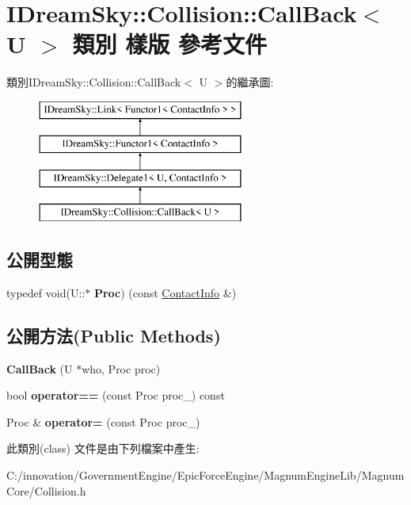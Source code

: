 \hypertarget{class_i_dream_sky_1_1_collision_1_1_call_back}{}\section{I\+Dream\+Sky\+:\+:Collision\+:\+:Call\+Back$<$ U $>$ 類別 樣版 參考文件}
\label{class_i_dream_sky_1_1_collision_1_1_call_back}
類別\+I\+Dream\+Sky\+:\+:Collision\+:\+:Call\+Back$<$ U $>$的繼承圖\+:\begin{figure}[H]
\begin{center}
\leavevmode
\includegraphics[height=4.000000cm]{class_i_dream_sky_1_1_collision_1_1_call_back}
\end{center}
\end{figure}
\subsection*{公開型態}
\begin{DoxyCompactItemize}
\item 
typedef void(U\+::$\ast$ {\bfseries Proc}) (const \hyperlink{class_i_dream_sky_1_1_collision_1_1_contact_info}{Contact\+Info} \&)\hypertarget{class_i_dream_sky_1_1_collision_1_1_call_back_a244d26a7409ff7ba6cfa250bf1cec7b9}{}\label{class_i_dream_sky_1_1_collision_1_1_call_back_a244d26a7409ff7ba6cfa250bf1cec7b9}

\end{DoxyCompactItemize}
\subsection*{公開方法(Public Methods)}
\begin{DoxyCompactItemize}
\item 
{\bfseries Call\+Back} (U $\ast$who, Proc proc)\hypertarget{class_i_dream_sky_1_1_collision_1_1_call_back_ac4b6f06302b584af05109ec9f99571d2}{}\label{class_i_dream_sky_1_1_collision_1_1_call_back_ac4b6f06302b584af05109ec9f99571d2}

\item 
bool {\bfseries operator==} (const Proc proc\+\_\+) const \hypertarget{class_i_dream_sky_1_1_collision_1_1_call_back_a65f372ce31fb1150aed35a1e75996f0f}{}\label{class_i_dream_sky_1_1_collision_1_1_call_back_a65f372ce31fb1150aed35a1e75996f0f}

\item 
Proc \& {\bfseries operator=} (const Proc proc\+\_\+)\hypertarget{class_i_dream_sky_1_1_collision_1_1_call_back_ad880bdb2ab8867aa1faec865a919416d}{}\label{class_i_dream_sky_1_1_collision_1_1_call_back_ad880bdb2ab8867aa1faec865a919416d}

\end{DoxyCompactItemize}


此類別(class) 文件是由下列檔案中產生\+:\begin{DoxyCompactItemize}
\item 
C\+:/innovation/\+Government\+Engine/\+Epic\+Force\+Engine/\+Magnum\+Engine\+Lib/\+Magnum\+Core/Collision.\+h\end{DoxyCompactItemize}
